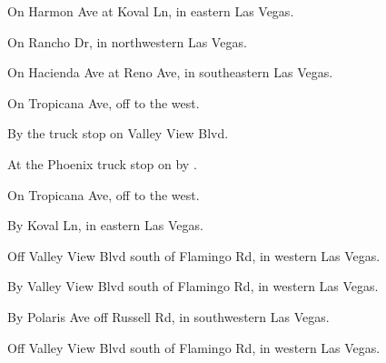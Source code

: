

\begin{LocationList}

On Harmon Ave at Koval Ln, in eastern Las Vegas.

On Rancho Dr, in northwestern Las Vegas.

On Hacienda Ave at Reno Ave, in southeastern Las Vegas.

On Tropicana Ave, off   to the west.

\Location{\GarageHQ \Garage}
By the truck stop on Valley View Blvd.

At the Phoenix truck stop on  by  .

\Location{\RecruitmentAgency \Recruitment}
On Tropicana Ave, off   to the west.

By Koval Ln, in eastern Las Vegas.

Off Valley View Blvd south of Flamingo Rd, in western Las Vegas.

By Valley View Blvd south of Flamingo Rd, in western Las Vegas.

By Polaris Ave off Russell Rd, in southwestern Las Vegas.

Off Valley View Blvd south of Flamingo Rd, in western Las Vegas.

\end{LocationList}
